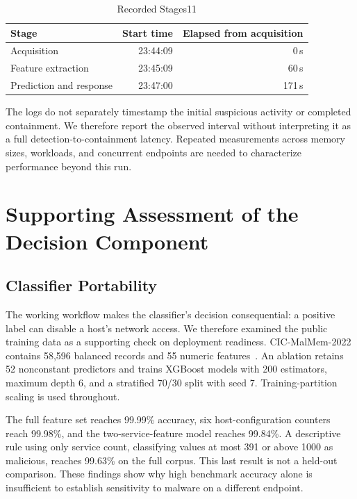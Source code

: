 \documentclass[conference]{IEEEtran}
\begin{document}
\begin{table}[t]
\caption{Recorded Stages11}
\label{tab:timing}
\centering
\small
\begin{tabular}{@{}lrr@{}}
\toprule
Stage & Start time & Elapsed from acquisition \\
\midrule
Acquisition & 23:44:09 & 0\,s \\
Feature extraction & 23:45:09 & 60\,s \\
Prediction and response & 23:47:00 & 171\,s \\
\bottomrule
\end{tabular}
\end{table}

The logs do not separately timestamp the initial suspicious activity or
completed containment. We therefore report the observed interval without
interpreting it as a full detection-to-containment latency. Repeated
measurements across memory sizes, workloads, and concurrent endpoints are
needed to characterize performance beyond this run.

\section{Supporting Assessment of the Decision Component}
\label{sec:assessment}

\subsection{Classifier Portability}
The working workflow makes the classifier's decision consequential: a positive
label can disable a host's network access. We therefore examined the public
training data as a supporting check on deployment readiness. CIC-MalMem-2022
contains 58{,}596 balanced records and 55 numeric features~\cite{carrier2022,cicmalmem}.
An ablation retains 52 nonconstant predictors and trains XGBoost models with
200 estimators, maximum depth 6, and a stratified 70/30 split with seed 7.
Training-partition scaling is used throughout.

The full feature set reaches 99.99\% accuracy, six host-configuration counters
reach 99.98\%, and the two-service-feature model reaches 99.84\%.
A descriptive rule using only service count, classifying values at most 391
or above 1000 as malicious, reaches 99.63\% on the full corpus. This last
result is not a held-out comparison. These findings show why high benchmark
accuracy alone is insufficient to establish sensitivity to malware on a
different endpoint.
\end{document}
